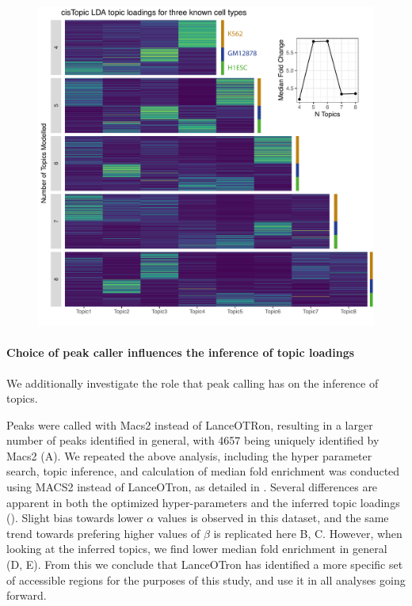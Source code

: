 \begin{figure}
  \centering
  \includegraphics[width=\textwidth]{plot/ch4/sc_topics.pdf}
  \label{fig:sc_topics}
\end{figure}

\paragraph{Choice of peak caller influences the inference of topic loadings}

We additionally investigate the role that peak calling has on the inference of topics. 

Peaks were called with Macs2 instead of LanceOTRon, resulting in a larger number of peaks identified in general, with 4657 being uniquely identified by Macs2 (A). We repeated the above analysis, including the hyper parameter search, topic inference, and calculation of median fold enrichment was conducted using MACS2 instead of LanceOTron, as detailed in . Several differences are apparent in both the optimized hyper-parameters and the inferred topic loadings (). Slight bias towards lower $\alpha$ values is observed in this dataset, and the same trend towards prefering higher values of $\beta$ is replicated here B, C. However, when looking at the inferred topics, we find lower median fold enrichment in general (D, E). From this we conclude that LanceOTron has identified a more specific set of accessible regions for the purposes of this study, and use it in all analyses going forward. 

